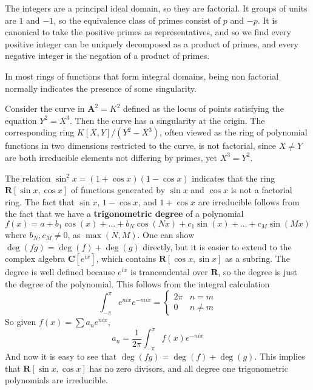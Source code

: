 \begin{example}
    The integers are a principal ideal domain, so they are factorial. It groups of units are $1$ and $-1$, so the equivalence class of primes consist of $p$ and $-p$. It is canonical to take the positive primes as representatives, and so we find every positive integer can be uniquely decomposed as a product of primes, and every negative integer is the negation of a product of primes.
\end{example}

In most rings of functions that form integral domains, being non factorial normally indicates the presence of some singularity.

\begin{example}
    Consider the curve in $\mathbf{A}^2 = K^2$ defined as the locus of points satisfying the equation $Y^2 = X^3$. Then the curve has a singularity at the origin. The corresponding ring $K[X,Y]/(Y^2 - X^3)$, often viewed as the ring of polynomial functions in two dimensions restricted to the curve, is not factorial, since $X \neq Y$ are both irreducible elements not differing by primes, yet $X^3 = Y^2$.
\end{example}

\begin{example}
    The relation $\sin^2 x = (1 + \cos x)(1 - \cos x)$ indicates that the ring $\mathbf{R}[\sin x, \cos x]$ of functions generated by $\sin x$ and $\cos x$ is not a factorial ring. The fact that $\sin x$, $1 - \cos x$, and $1 + \cos x$ are irreducible follows from the fact that we have a {\bf trigonometric degree} of a polynomial
    \[ f(x) = a + b_1 \cos(x) + \dots + b_N \cos(Nx) + c_1 \sin(x) + \dots + c_M \sin(Mx) \]
    where $b_N, c_M \neq 0$, as $\max(N,M)$. One can show $\deg(fg) = \deg(f) + \deg(g)$ directly, but it is easier to extend to the complex algebra $\mathbf{C}[e^{ix}]$, which contains $\mathbf{R}[\cos x, \sin x]$ as a subring. The degree is well defined because $e^{ix}$ is trancendental over $\mathbf{R}$, so the degree is just the degree of the polynomial. This follows from the integral calculation
    \[ \int_{-\pi}^\pi e^{nix} e^{-mix} = \begin{cases} 2\pi & n = m \\ 0 & n \neq m \end{cases} \]
    So given $f(x) = \sum a_n e^{nix}$,
    \[ a_n = \frac{1}{2\pi} \int_{-\pi}^\pi f(x) e^{-nix} \]
    And now it is easy to see that $\deg(fg) = \deg(f) + \deg(g)$. This implies that $\mathbf{R}[\sin x, \cos x]$ has no zero divisors, and all degree one trigonometric polynomials are irreducible.
\end{example}

